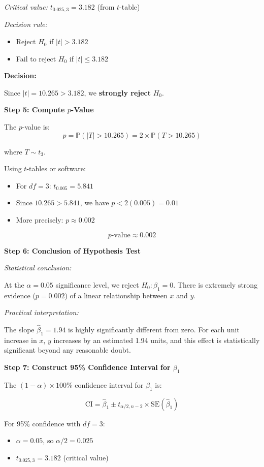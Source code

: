 \documentclass[12pt]{article}
\begin{document}
\begin{solution}
\textit{Critical value:} $t_{0.025, 3} = 3.182$ (from $t$-table)

\textit{Decision rule:}
\begin{itemize}
    \item Reject $H_0$ if $|t| > 3.182$
    \item Fail to reject $H_0$ if $|t| \leq 3.182$
\end{itemize}

\textbf{Decision:}

Since $|t| = 10.265 > 3.182$, we \textbf{strongly reject} $H_0$.

\textbf{Step 5: Compute $p$-Value}

The $p$-value is:
\[
p = \mathbb{P}(|T| > 10.265) = 2 \times \mathbb{P}(T > 10.265)
\]

where $T \sim t_3$.

Using $t$-tables or software:
\begin{itemize}
    \item For $df = 3$: $t_{0.005} = 5.841$
    \item Since $10.265 > 5.841$, we have $p < 2(0.005) = 0.01$
    \item More precisely: $p \approx 0.002$
\end{itemize}

\[
\boxed{p\text{-value} \approx 0.002}
\]

\textbf{Step 6: Conclusion of Hypothesis Test}

\textit{Statistical conclusion:}

At the $\alpha = 0.05$ significance level, we reject $H_0: \beta_1 = 0$. There is extremely strong evidence ($p = 0.002$) of a linear relationship between $x$ and $y$.

\textit{Practical interpretation:}

The slope $\hat{\beta}_1 = 1.94$ is highly significantly different from zero. For each unit increase in $x$, $y$ increases by an estimated 1.94 units, and this effect is statistically significant beyond any reasonable doubt.

\textbf{Step 7: Construct 95\% Confidence Interval for $\beta_1$}

The $(1-\alpha) \times 100\%$ confidence interval for $\beta_1$ is:

\[
\text{CI} = \hat{\beta}_1 \pm t_{\alpha/2, n-2} \times \text{SE}(\hat{\beta}_1)
\]

For 95\% confidence with $df = 3$:
\begin{itemize}
    \item $\alpha = 0.05$, so $\alpha/2 = 0.025$
    \item $t_{0.025, 3} = 3.182$ (critical value)
\end{itemize}


\end{solution}
\end{document}
